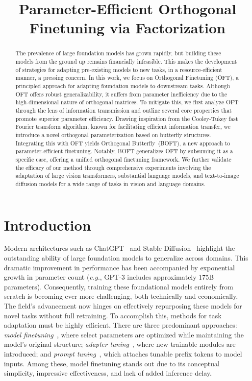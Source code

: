 \title{Parameter-Efficient Orthogonal Finetuning via Factorization}

\begin{abstract}
The prevalence of large foundation models has grown rapidly, but building these models from the ground up remains financially infeasible. This makes the development of strategies for adapting pre-existing models to new tasks, in a resource-efficient manner, a pressing concern. In this work, we focus on Orthogonal Finetuning (OFT), a principled approach for adapting foundation models to downstream tasks. Although OFT offers robust generalizability, it suffers from parameter inefficiency due to the high-dimensional nature of orthogonal matrices. To mitigate this, we first analyze OFT through the lens of information transmission and outline several core properties that promote superior parameter efficiency. Drawing inspiration from the Cooley-Tukey fast Fourier transform algorithm, known for facilitating efficient information transfer, we introduce a novel orthogonal parameterization based on butterfly structures. Integrating this with OFT yields Orthogonal Butterfly~(BOFT), a new approach to parameter-efficient finetuning. Notably, BOFT generalizes OFT by subsuming it as a specific case, offering a unified orthogonal finetuning framework. We further validate the efficacy of our method through comprehensive experiments involving the adaptation of large vision transformers, substantial language models, and text-to-image diffusion models for a wide range of tasks in vision and language domains.
\end{abstract}

\section{Introduction}

Modern architectures such as ChatGPT~\cite{brown2020language,chen2021evaluating} and Stable Diffusion~\cite{rombach2022high} highlight the outstanding ability of large foundation models to generalize across domains. This dramatic improvement in performance has been accompanied by exponential growth in parameter count (\emph{e.g.}, GPT-3 includes approximately 175B parameters). Consequently, training these foundational models entirely from scratch is becoming ever more challenging, both technically and economically. The field’s advancement now hinges on effectively repurposing these models for novel tasks without full retraining. To accomplish this, methods for task adaptation must be highly efficient. There are three predominant approaches: \emph{model finetuning}~\cite{hulora2022,zaken2022bitfit,guo2020parameter,raffel2020exploring,qiu2023controlling,zhang2022adaptive,chavan2023one}, where select parameters are optimized while maintaining the model’s original structure; \emph{adapter tuning}~\cite{rebuffi2017learning,houlsby2019parameter,pfeiffer2020adapterfusion,lin2020exploring,he2021towards}, where new trainable modules are introduced; and \emph{prompt tuning}~\cite{li2021prefix,lester2021power}, which attaches tunable prefix tokens to model inputs. Among these, model finetuning stands out due to its conceptual simplicity, impressive effectiveness, and lack of added inference delay.

